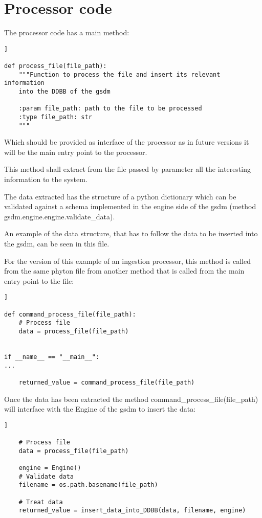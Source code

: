 \section{Processor code}

The processor code has a main method:

\begin{lstlisting}[breaklines=true, style=c]]

def process_file(file_path):
    """Function to process the file and insert its relevant information
    into the DDBB of the gsdm

    :param file_path: path to the file to be processed
    :type file_path: str
    """

\end{lstlisting}

Which should be provided as interface of the processor as in future versions it will be the main entry point to the processor.

This method shall extract from the file passed by parameter all the interesting information to the system.

The data extracted has the structure of a python dictionary which can be validated against a schema implemented in the engine side of the gsdm (method gsdm.engine.engine.validate\_data).

An example of the data structure, that has to follow the data to be inserted into the gsdm, can be seen in this file.

For the version of this example of an ingestion processor, this method is called from the same phyton file from another method that is called from the main entry point to the file:

\begin{lstlisting}[breaklines=true, style=c]]

def command_process_file(file_path):
    # Process file
    data = process_file(file_path)


if __name__ == "__main__":
...

    returned_value = command_process_file(file_path)

\end{lstlisting}

Once the data has been extracted the method command\_process\_file(file\_path) will interface with the Engine of the gsdm to insert the data:

\begin{lstlisting}[breaklines=true, style=c]]

    # Process file
    data = process_file(file_path)

    engine = Engine()
    # Validate data
    filename = os.path.basename(file_path)

    # Treat data
    returned_value = insert_data_into_DDBB(data, filename, engine)

\end{lstlisting}

